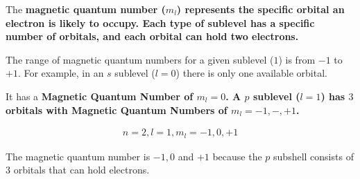 \begin{definition}
    The \bf{magnetic quantum number ($m_l$)} represents the specific orbital an
    electron is likely to occupy. Each type of sublevel has a specific number of
    orbitals, and each orbital can hold two electrons.

    The range of magnetic quantum numbers for a given sublevel ($1$) is from $-1$ to
    $+1$. For example, in an $s$ sublevel ($l = 0$) there is only one available
    orbital.

    It has a \bf{Magnetic Quantum Number} of $m_l = 0$. A $p$ sublevel ($l = 1$)
    has $3$ orbitals with \bf{Magnetic Quantum Numbers} of $m_l = -1, -, +1$.

    \begin{align}
        n = 2, l = 1, m_l = -1, 0, +1
    \end{align}
    
    The magnetic quantum number is $-1, 0$ and $+1$
    because the $p$ subshell consists of $3$ orbitals that can hold electrons.
\end{definition}


